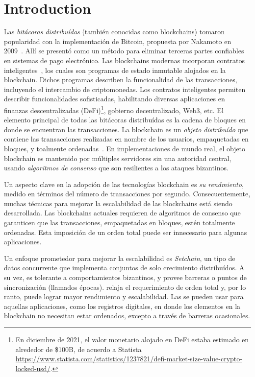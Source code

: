 \chapter{Introduction}
Las \textit{bitácoras distribuídas} (también conocidas como blockchains) tomaron
popularidad con la implementación de Bitcoin, propuesta por Nakamoto en
2009~\cite{nakamoto06bitcoin}.
Allí se presentó como un método para eliminar terceras partes confiables en sistemas
de pago electrónico.
%
Las blockchains modernas incorporan contratos inteligentes~\cite{szabo96smart,ethereum},
los cuales son programas de estado inmutable alojados en la blockchain. Dichos
programas describen la funcionalidad de las transacciones, incluyendo el intercambio
de criptomonedas.
%
Los contratos inteligentes permiten describir funcionalidades sofisticadas, habilitando
diversas aplicaciones en finanzas descentralizadas (DeFi)\footnote{En diciembre de 2021,
el valor monetario alojado en DeFi estaba estimado en alrededor de \$100B, de acuerdo a Statista
\url{https://www.statista.com/statistics/1237821/defi-market-size-value-crypto-locked-usd/}.},
gobierno decentralizado, Web3, etc.
%
El elemento principal de todas las  bitácoras distribuídas es la cadena de bloques en donde
se encuentran las transacciones.
%
La blockchain es un \textit{objeto distribuído} que contiene las transacciones realizadas
en nombre de los usuarios, empaquetadas en bloques, y toalmente
ordenadas~\cite{anta2018formalizing,anta2021principles}.
%
En implementaciones de mundo real, el objeto blockchain es mantenido por múltiples servidores
sin una autoridad central, usando \emph{algoritmos de consenso} que son resilientes a los
ataques bizantinos.
%

Un aspecto clave en la adopción de las tecnologías blockchain es \emph{su rendmiento}, medido
en términos del número de transacciones por segundo.
%
Consecuentemente, muchas técnicas para mejorar la escalabilidad de las blockchains
está siendo desarrollada.
%
Las blockchains actuales requieren de algoritmos de consenso que garanticen que las
transacciones, empaquetadas en bloques, estén totalmente ordenadas.
%
Esta imposición de un orden total puede ser innecesario para algunas aplicaciones.


%
Un enfoque prometedor para mejorar la escalabilidad es \textit{Setchain}, un tipo de
datos concurrente que implementa conjuntos de solo crecimiento distribuídos. A su vez,
es tolerante a comportamientos bizantinos, y provee barreras o puntos de sincronización
(llamados épocas).
%
\setchain relaja el requerimiento de orden total y, por lo ranto, puede lograr mayor
rendimiento y escalabilidad.
%
Las \setchains se pueden usar para aquellas aplicaciones, como los registros digitales,
en donde los elementos en la blockchain no necesitan estar ordenados, excepto a través
de barreras ocasionales.

